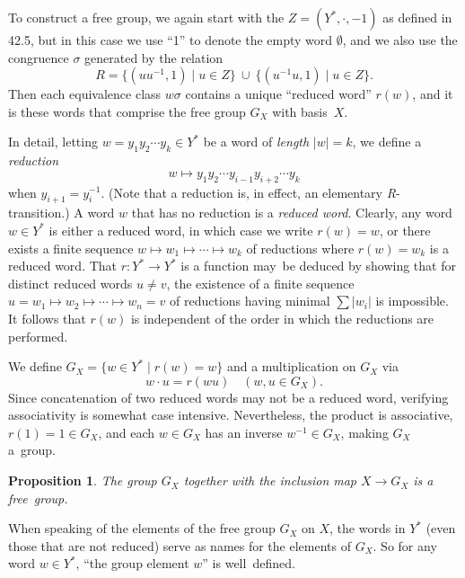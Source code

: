 \documentclass{surv-l}
\numberwithin{equation}{section}
\numberwithin{table}{section}
\numberwithin{figure}{section}
\newtheorem{proposition}[equation]{Proposition}
\theoremstyle{definition}
\begin{document}
To construct a free group, we again start with the $Z=(Y^{\ast},\cdot,
-1)$ as defined in 42.5, but in this case we use ``1'' to denote
the empty word $\emptyset$, and we also use the congruence
$\sigma$ generated by the relation
\[
R=\{(uu^{-1},1)\mid u\in Z\}\ \cup\ \{(u^{-1}u, 1)\mid u\in Z\}.
\]
Then each equivalence class $ w\sigma$ contains a unique ``reduced
word'' $r(w)$, and it is these words that
comprise the free group $G_{X}$ with basis~$X$.

In detail, letting $w=y_{1}y_{2}\cdots y_{k}\in Y^{\ast}$ be a
word of \emph{length} $|w|=k$, we define a
\emph{reduction}
\[
w\mapsto y_{1}y_{2}\cdots y_{i-1}y_{i+2}\cdots y_{k}
\]
when $y_{i+1}=y_{i}^{-1}$. (Note that a reduction is, in effect,
an elementary \emph{R}-transition.) A word $w$ that has no
reduction is a \emph{reduced word}. Clearly, any word $w\in
Y^{\ast}$ is either a reduced word, in which case we write
$r(w)=w$, or there exists a finite sequence $w\mapsto
w_{1}\mapsto\cdots\mapsto w_{k}$ of reductions where $r(w)=w_{k}$
is a reduced word. That $r : Y^{\ast}\rightarrow Y^{\ast}$ is a
function may~be deduced by showing that for distinct reduced words
$u\neq v$, the existence of a finite sequence $u=w_{1}\mapsto
w_{2}\mapsto\cdots\mapsto w_{n}=v$ of reductions having minimal
$\sum|w_{i}|$ is impossible. It follows that $r(w)$ is independent
of the order in which the reductions are performed.

We define $G_{X}=\{w\in Y^{\ast}\mid r(w)=w\}$ and a
multiplication on $G_{X}$ via
\[
w\cdot u=r(wu)\quad (w, u\in G_{X}).
\]
Since concatenation of two reduced words may not be a reduced
word, verifying associativity is somewhat case intensive.
Nevertheless, the product is associative, $r(1)=1\in G_{X}$, and
each $w\in G_{X}$ has an inverse $w^{-1}\in G_{X}$, making $G_{X}$
a~group.

\begin{proposition}\label{prop9.42.9}
The group $G_{X}$ together with the inclusion map $X\rightarrow
G_{X}$ is a free~group.
\end{proposition}

When speaking of the elements of the free group $G_{X}$ on $X$,
the words in $Y^{\ast}$ (even those that are not reduced) serve as
names for the elements of $G_{X}$. So for any word $w\in
Y^{\ast}$, ``the group element $w$'' is well~defined.
\end{document}
